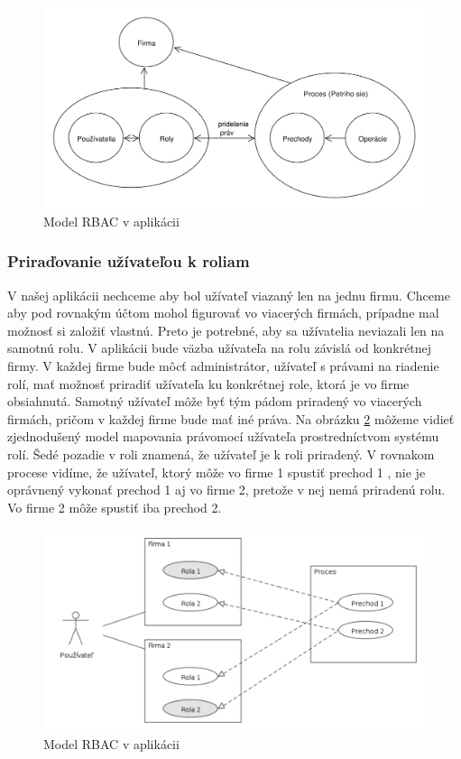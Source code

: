 	\begin{figure}[h]
		\centering
		\includegraphics[width=0.9\linewidth]{images/roles_in_petri_model}
		\caption{ Model RBAC v aplikácii}
		\label{fig:model_rbac_v_aplikacii}
	\end{figure}
	
	\subsubsection{Priraďovanie užívateľou k roliam}
	V našej aplikácii nechceme aby bol užívateľ viazaný len na jednu firmu. Chceme aby pod rovnakým účtom mohol figurovať vo viacerých firmách, prípadne mal možnosť si založiť vlastnú. Preto je potrebné, aby sa užívatelia neviazali len na samotnú rolu. V aplikácii bude väzba užívateľa na rolu závislá od konkrétnej firmy. V každej firme bude môcť administrátor, užívateľ s právami na riadenie rolí, mať možnosť priradiť užívateľa ku konkrétnej role, ktorá je vo firme obsiahnutá. Samotný užívateľ môže byť tým pádom priradený vo viacerých firmách, pričom v každej firme bude mať iné práva. Na obrázku  \ref{fig:user_to_roles} môžeme vidieť zjednodušený model mapovania právomocí užívateľa prostredníctvom systému rolí.
	Šedé pozadie v roli znamená, že užívateľ je k roli priradený.  V rovnakom procese vidíme, že užívateľ, ktorý môže vo firme 1 spustiť prechod 1 , nie je oprávnený vykonať prechod 1 aj vo firme 2, pretože v nej nemá priradenú rolu. Vo firme 2 môže spustiť iba prechod 2.
	
		\begin{figure}[h]
			\centering
			\includegraphics[width=0.9\linewidth]{images/user_to_roles}
			\caption{ Model RBAC v aplikácii}
			\label{fig:user_to_roles}
		\end{figure}
	

